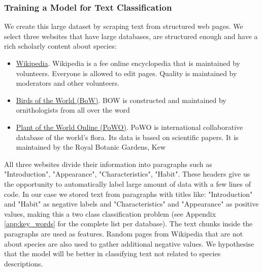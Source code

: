 \documentclass[a4paper, 12pt, oneside]{book} %
\begin{document}
\subsubsection{Training a Model for Text Classification} \label{par:reedloss}
We create this large dataset by scraping text from structured web pages.
We select three websites that have large databases, are structured enough and have a rich scholarly content about species:
\begin{itemize}
    \item \href{www.wikipedia.com}{Wikipedia}. Wikipedia is a fee online encyclopedia that is maintained by volunteers. Everyone is allowed to edit pages. Quality is maintained by moderators and other volunteers.
    \item \href{https://birdsoftheworld.org/bow/home}{Birds of the World (BoW)}. BOW is constructed and maintained by ornithologists from all over the word \autocite{billerman_birds_2020}
    \item \href{https://powo.science.kew.org/}{Plant of the World Online (PoWO)}. PoWO is international collaborative database of the world's flora. Its data is based on scientific papers. It is maintained by the Royal Botanic Gardens, Kew  \autocite{facilitated_by_the_royal_botanic_gardens_plants_2019}
\end{itemize}
All three websites divide their information into paragraphs such as "Introduction", "Appearance", "Characteristics", "Habit".
These headers give us the opportunity to automatically label large amount of data with a few lines of code.
In our case we stored text from paragraphs with titles like:  "Introduction" and "Habit" as negative labels and "Characteristics" and "Appearance" as positive values, making this a two class classification problem (see Appendix \ref{app:key_words} for the complete list per database).
The text chunks inside the paragraphs are used as features.
Random pages from Wikipedia that are not about species are also used to gather additional negative values.
We hypothesise that the model will be better in classifying text not related to species descriptions.

\end{document}

